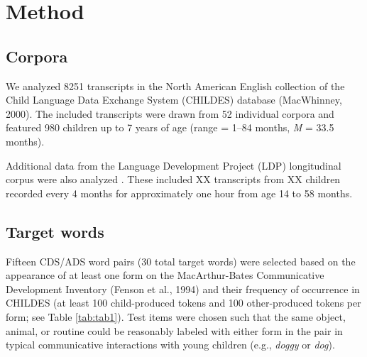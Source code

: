 \documentclass[10pt, letterpaper]{article}
\begin{document}
\hypertarget{method}{%
\section{Method}\label{method}}

\hypertarget{corpora}{%
\subsection{Corpora}\label{corpora}}

We analyzed 8251 transcripts in the North American English collection of
the Child Language Data Exchange System (CHILDES) database (MacWhinney,
2000). The included transcripts were drawn from 52 individual corpora
and featured 980 children up to 7 years of age (range = 1--84 months,
\emph{M} = 33.5 months).

Additional data from the Language Development Project (LDP) longitudinal
corpus were also analyzed . These included XX transcripts from XX
children recorded every 4 months for approximately one hour from age 14
to 58 months.

\hypertarget{target-words}{%
\subsection{Target words}\label{target-words}}

Fifteen CDS/ADS word pairs (30 total target words) were selected based
on the appearance of at least one form on the MacArthur-Bates
Communicative Development Inventory (Fenson et al., 1994) and their
frequency of occurrence in CHILDES (at least 100 child-produced tokens
and 100 other-produced tokens per form; see Table \ref{tab:tab1}). Test
items were chosen such that the same object, animal, or routine could be
reasonably labeled with either form in the pair in typical communicative
interactions with young children (e.g., \emph{doggy} or \emph{dog}).
\end{document}
